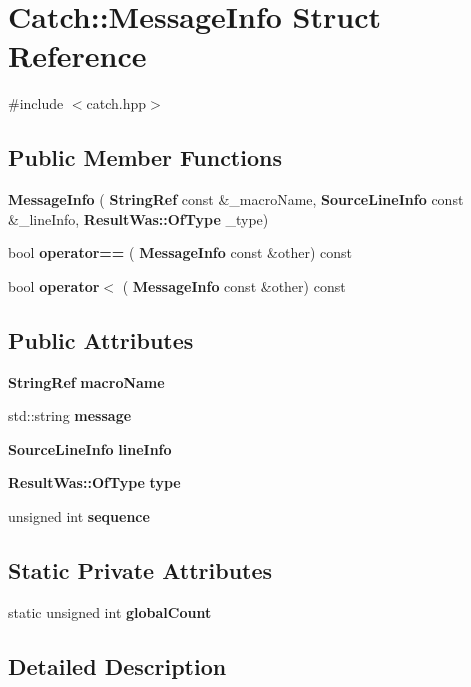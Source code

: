 \section{Catch\+::Message\+Info Struct Reference}
\label{struct_catch_1_1_message_info}


{\ttfamily \#include $<$catch.\+hpp$>$}

\subsection*{Public Member Functions}
\begin{DoxyCompactItemize}
\item 
\textbf{ Message\+Info} (\textbf{ String\+Ref} const \&\+\_\+macro\+Name, \textbf{ Source\+Line\+Info} const \&\+\_\+line\+Info, \textbf{ Result\+Was\+::\+Of\+Type} \+\_\+type)
\item 
bool \textbf{ operator==} (\textbf{ Message\+Info} const \&other) const
\item 
bool \textbf{ operator$<$} (\textbf{ Message\+Info} const \&other) const
\end{DoxyCompactItemize}
\subsection*{Public Attributes}
\begin{DoxyCompactItemize}
\item 
\textbf{ String\+Ref} \textbf{ macro\+Name}
\item 
std\+::string \textbf{ message}
\item 
\textbf{ Source\+Line\+Info} \textbf{ line\+Info}
\item 
\textbf{ Result\+Was\+::\+Of\+Type} \textbf{ type}
\item 
unsigned int \textbf{ sequence}
\end{DoxyCompactItemize}
\subsection*{Static Private Attributes}
\begin{DoxyCompactItemize}
\item 
static unsigned int \textbf{ global\+Count}
\end{DoxyCompactItemize}


\subsection{Detailed Description}



